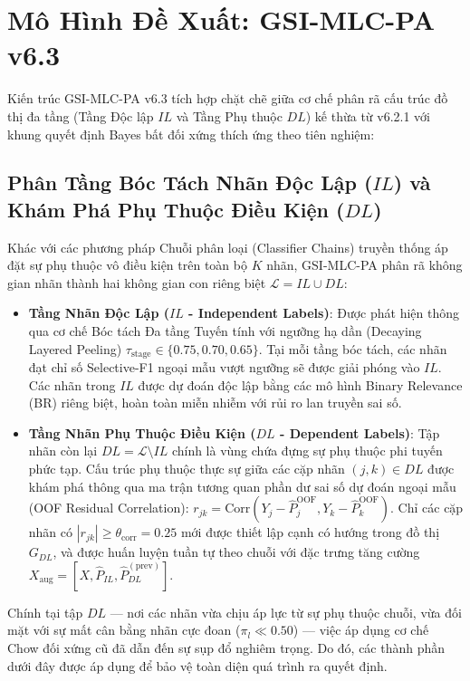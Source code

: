 \documentclass[10pt,a4paper,twoside]{article}
\begin{document}
\section{Mô Hình Đề Xuất: GSI-MLC-PA v6.3}
Kiến trúc GSI-MLC-PA v6.3 tích hợp chặt chẽ giữa cơ chế phân rã cấu trúc đồ thị đa tầng (Tầng Độc lập $IL$ và Tầng Phụ thuộc $DL$) kế thừa từ v6.2.1 với khung quyết định Bayes bất đối xứng thích ứng theo tiên nghiệm:

\subsection{Phân Tầng Bóc Tách Nhãn Độc Lập ($IL$) và Khám Phá Phụ Thuộc Điều Kiện ($DL$)}
Khác với các phương pháp Chuỗi phân loại (Classifier Chains) truyền thống áp đặt sự phụ thuộc vô điều kiện trên toàn bộ $K$ nhãn, GSI-MLC-PA phân rã không gian nhãn thành hai không gian con riêng biệt $\mathcal{L} = IL \cup DL$:
\begin{itemize}
    \item \textbf{Tầng Nhãn Độc Lập ($IL$ - Independent Labels)}: Được phát hiện thông qua cơ chế Bóc tách Đa tầng Tuyến tính với ngưỡng hạ dần (Decaying Layered Peeling) $\tau_{\text{stage}} \in \{0.75, 0.70, 0.65\}$. Tại mỗi tầng bóc tách, các nhãn đạt chỉ số Selective-F1 ngoại mẫu vượt ngưỡng sẽ được giải phóng vào $IL$. Các nhãn trong $IL$ được dự đoán độc lập bằng các mô hình Binary Relevance (BR) riêng biệt, hoàn toàn miễn nhiễm với rủi ro lan truyền sai số.
    \item \textbf{Tầng Nhãn Phụ Thuộc Điều Kiện ($DL$ - Dependent Labels)}: Tập nhãn còn lại $DL = \mathcal{L} \setminus IL$ chính là vùng chứa đựng sự phụ thuộc phi tuyến phức tạp. Cấu trúc phụ thuộc thực sự giữa các cặp nhãn $(j, k) \in DL$ được khám phá thông qua ma trận tương quan phần dư sai số dự đoán ngoại mẫu (OOF Residual Correlation): $r_{jk} = \text{Corr}(Y_j - \hat{P}_j^{\text{OOF}}, Y_k - \hat{P}_k^{\text{OOF}})$. Chỉ các cặp nhãn có $|r_{jk}| \ge \theta_{\text{corr}} = 0.25$ mới được thiết lập cạnh có hướng trong đồ thị $G_{DL}$, và được huấn luyện tuần tự theo chuỗi với đặc trưng tăng cường $X_{\text{aug}} = [X, \hat{P}_{IL}, \hat{P}_{DL}^{(\text{prev})}]$.
\end{itemize}
Chính tại tập $DL$ --- nơi các nhãn vừa chịu áp lực từ sự phụ thuộc chuỗi, vừa đối mặt với sự mất cân bằng nhãn cực đoan ($\pi_l \ll 0.50$) --- việc áp dụng cơ chế Chow đối xứng cũ đã dẫn đến sự sụp đổ nghiêm trọng. Do đó, các thành phần dưới đây được áp dụng để bảo vệ toàn diện quá trình ra quyết định.
\end{document}
